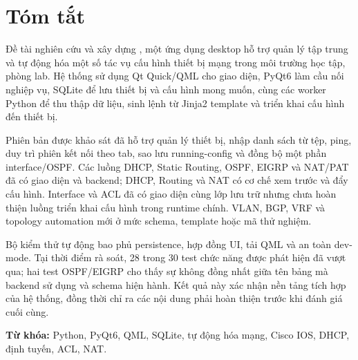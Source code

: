 \chapter*{Tóm tắt}

Đề tài nghiên cứu và xây dựng \SoftwareName, một ứng dụng desktop hỗ trợ quản lý tập trung và tự động hóa một số tác vụ cấu hình thiết bị mạng trong môi trường học tập, phòng lab. Hệ thống sử dụng Qt Quick/QML cho giao diện, PyQt6 làm cầu nối nghiệp vụ, SQLite để lưu thiết bị và cấu hình mong muốn, cùng các worker Python để thu thập dữ liệu, sinh lệnh từ Jinja2 template và triển khai cấu hình đến thiết bị.

Phiên bản được khảo sát đã hỗ trợ quản lý thiết bị, nhập danh sách từ tệp, ping, duy trì phiên kết nối theo tab, sao lưu running-config và đồng bộ một phần interface/OSPF. Các luồng DHCP, Static Routing, OSPF, EIGRP và NAT/PAT đã có giao diện và backend; DHCP, Routing và NAT có cơ chế xem trước và đẩy cấu hình. Interface và ACL đã có giao diện cùng lớp lưu trữ nhưng chưa hoàn thiện luồng triển khai cấu hình trong runtime chính. VLAN, BGP, VRF và topology automation mới ở mức schema, template hoặc mã thử nghiệm.

Bộ kiểm thử tự động bao phủ persistence, hợp đồng UI, tải QML và an toàn dev-mode. Tại thời điểm rà soát, 28 trong 30 test chức năng được phát hiện đã vượt qua; hai test OSPF/EIGRP cho thấy sự không đồng nhất giữa tên bảng mà backend sử dụng và schema hiện hành. Kết quả này xác nhận nền tảng tích hợp của hệ thống, đồng thời chỉ ra các nội dung phải hoàn thiện trước khi đánh giá cuối cùng.

\textbf{Từ khóa:} Python, PyQt6, QML, SQLite, tự động hóa mạng, Cisco IOS, DHCP, định tuyến, ACL, NAT.
